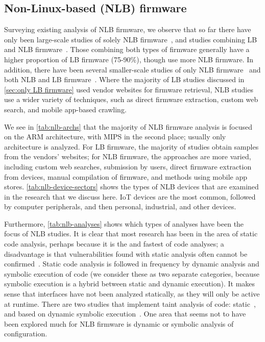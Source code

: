 \subsection{Non-Linux-based (NLB) firmware}
Surveying existing analysis of NLB firmware, we observe that so far there have only been  large-scale studies of solely NLB firmware~\cite{gritti2022heapster, wen2020firmxray}, and  studies combining LB and NLB firmware~\cite{costin2014large, feng2016scalable, shirani2018binarm, zhao2022largescale}.
Those combining both types of firmware generally have a higher proportion of LB firmware (75-90\%), though  use more NLB firmware.
In addition, there have been several smaller-scale studies of only NLB firmware~\cite{clements2020halucinator, davidson2013fie, feng2020p2im, zaddach2014avatar, hernandez2017firmusb, redini2017bootstomp, gustafson2019toward} and both NLB and LB firmware~\cite{redini2020karonte, eschweiler2016discovre, muench2018what, shoshitaishvili2015firmalice, pewny2015crossarchitecture}.
Where the majority of LB studies discussed in \autoref{sec:only LB firmware} used vendor websites for firmware retrieval, NLB studies use a wider variety of techniques, such as direct firmware extraction, custom web search, and mobile app-based crawling.


We see in \autoref{tab:nlb-archs} that the majority of NLB firmware analysis is focused on the ARM architecture, with MIPS in the second place; usually only  architecture is analyzed.
For LB firmware, the majority of studies obtain samples from the vendors' websites; for NLB firmware, the approaches are more varied, including custom web searches, submission by users, direct firmware extraction from devices, manual compilation of firmware, and methods using mobile app stores.
\autoref{tab:nlb-device-sectors} shows the types of NLB devices that are examined in the research that we discuss here.
IoT devices are the most common, followed by computer peripherals, and then personal, industrial, and other devices.



Furthermore, \autoref{tab:nlb-analyses} shows which types of analyses have been the focus of NLB studies.
It is clear that most research has been in the area of static code analysis, perhaps because it is the  and fastest of code analyses; a disadvantage is that vulnerabilities found with static analysis often cannot be confirmed~\cite{pewny2015crossarchitecture}.
Static code analysis is followed in frequency by dynamic analysis and symbolic execution of code (we consider these as two separate categories, because symbolic execution is a hybrid between static and dynamic execution).
It makes sense that interfaces have not been analyzed statically, as they will only be active at runtime.
There are two studies that implement taint analysis of code: static~\cite{redini2020karonte}, and based on dynamic symbolic execution~\cite{redini2017bootstomp}.
One area that seems not to have been explored much for NLB firmware is dynamic or symbolic analysis of configuration.
